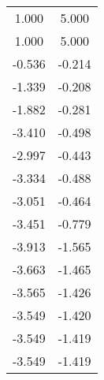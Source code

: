 \begin{table}[h]
\centering
\begin{tabular}{cc}
1.000	&	5.000	 \\ 
1.000	&	5.000	 \\ 
-0.536	&	-0.214	 \\ 
-1.339	&	-0.208	 \\ 
-1.882	&	-0.281	 \\ 
-3.410	&	-0.498	 \\ 
-2.997	&	-0.443	 \\ 
-3.334	&	-0.488	 \\ 
-3.051	&	-0.464	 \\ 
-3.451	&	-0.779	 \\ 
-3.913	&	-1.565	 \\ 
-3.663	&	-1.465	 \\ 
-3.565	&	-1.426	 \\ 
-3.549	&	-1.420	 \\ 
-3.549	&	-1.419	 \\ 
-3.549	&	-1.419	 \\ 
\end{tabular}
\end{table}
